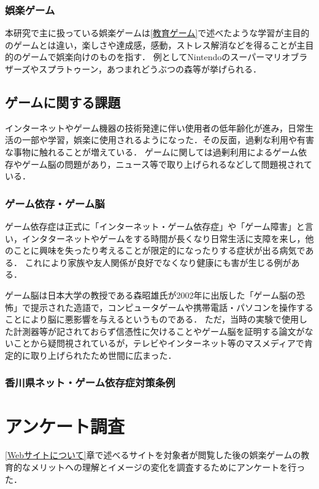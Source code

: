 \documentclass[12pt,a4j,titlepage]{ltjsarticle}
\begin{document}
\subsubsection{娯楽ゲーム}
本研究で主に扱っている娯楽ゲームは\ref{教育ゲーム}で述べたような学習が主目的のゲームとは違い，楽しさや達成感，感動，ストレス解消などを得ることが主目的のゲームで娯楽向けのものを指す．
例としてNintendoのスーパーマリオブラザーズやスプラトゥーン，あつまれどうぶつの森等が挙げられる．

\subsection{ゲームに関する課題}
インターネットやゲーム機器の技術発達に伴い使用者の低年齢化が進み，日常生活の一部や学習，娯楽に使用されるようになった．その反面，過剰な利用や有害な事物に触れることが増えている．
ゲームに関しては過剰利用によるゲーム依存やゲーム脳の問題があり，ニュース等で取り上げられるなどして問題視されている．

\subsubsection{ゲーム依存・ゲーム脳}
ゲーム依存症は正式に「インターネット・ゲーム依存症」や「ゲーム障害」と言い，インタターネットやゲームをする時間が長くなり日常生活に支障を来し，他のことに興味を失ったり考えることが限定的になったりする症状が出る病気である．
これにより家族や友人関係が良好でなくなり健康にも害が生じる例がある．

ゲーム脳は日本大学の教授である森昭雄氏が2002年に出版した「ゲーム脳の恐怖」\cite{ゲーム脳の恐怖}で提示された造語で，コンピュータゲームや携帯電話・パソコンを操作することにより脳に悪影響を与えるというものである．
ただ，当時の実験で使用した計測器等が記されておらず信憑性に欠けることやゲーム脳を証明する論文がないことから疑問視されているが，テレビやインターネット等のマスメディアで肯定的に取り上げられたため\cite{ゲーム脳メディア}世間に広まった．

\subsubsection{香川県ネット・ゲーム依存症対策条例}

\section{アンケート調査}\label{アンケート調査}
\ref{Webサイトについて}章で述べるサイトを対象者が閲覧した後の娯楽ゲームの教育的なメリットへの理解とイメージの変化を調査するためにアンケートを行った．
\end{document}
